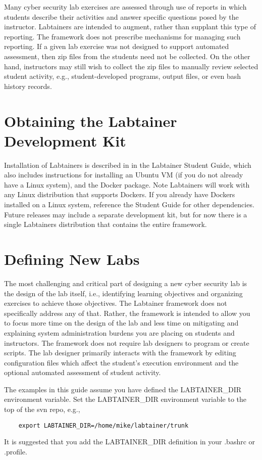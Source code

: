 \documentclass[12pt]{article}
\begin{document}
Many cyber security lab exercises are assessed through use of reports in which students
describe their activities and answer specific questions posed by the instructor.  Labtainers
are intended to augment, rather than supplant this type of reporting.  The framework does not
prescribe mechanisms for managing such reporting.  If a given lab exercise was not designed
to support automated assessment, then zip files from the students need not be collected.  On
the other hand, instructors may still wish to collect the zip files to manually review selected
student activity, e.g., student-developed programs, output files, or even bash history records.  

\section {Obtaining the Labtainer Development Kit}
Installation of Labtainers is described in in the Labtainer Student Guide,  
which also includes instructions for installing an Ubuntu VM (if you do not already have a Linux system),
and the Docker package.  Note Labtainers will work with any Linux
distribution that supports Dockers.  If you already have Dockers installed on a Linux system, 
reference the Student Guide for other dependencies. 
Future releases may include a separate development kit, but for now there is a single Labtainers distribution
that contains the entire framework.


\section {Defining New Labs}
\label{sec:new_labs}
The most challenging and critical part of designing a new cyber security lab
is the design of the lab itself, i.e., identifying learning objectives and
organizing exercises to achieve those objectives.  The Labtainer framework
does not specifically address any of that.  Rather, the framework is intended
to allow you to focus more time on the design of the lab and less time on mitigating and
explaining system administration burdens you are placing on students and instructors.
The framework does not require lab designers to program or create scripts.  The
lab designer primarily interacts with the framework by editing configuration files
which affect the student's execution environment and the optional automated
assessment of student activity.

The examples in this guide assume you have defined the LABTAINER\_DIR environment variable.
Set the LABTAINER\_DIR environment variable to the top of the svn repo, e.g.,
\begin{verbatim}
    export LABTAINER_DIR=/home/mike/labtainer/trunk
\end{verbatim}
It is suggested that you add the LABTAINER\_DIR definition in your .bashrc or .profile.
\end{document}
